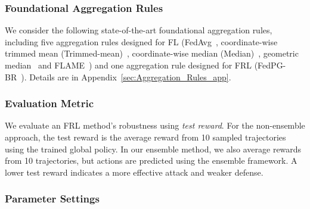 \subsubsection{Foundational Aggregation Rules}
\label{base_agg}

We consider the following state-of-the-art foundational aggregation rules, including five aggregation rules designed for FL (FedAvg~\cite{mcmahan2017communication}, coordinate-wise trimmed mean (Trimmed-mean)~\cite{yin2018byzantine}, coordinate-wise median (Median)~\cite{yin2018byzantine}, geometric median~\cite{ChenPOMACS17} and FLAME~\cite{nguyen2022flame}) and one aggregation rule designed for FRL (FedPG-BR~\cite{fan2021fault}).
Details are in Appendix~\ref{sec:Aggregation_Rules_app}.




\subsubsection{Evaluation Metric}



We evaluate an FRL method’s robustness using \emph{test reward}. For the non-ensemble approach, the test reward is the average reward from 10 sampled trajectories using the trained global policy. In our ensemble method, we also average rewards from 10 trajectories, but actions are predicted using the ensemble framework. A lower test reward indicates a more effective attack and weaker defense.



\subsubsection{Parameter Settings}



